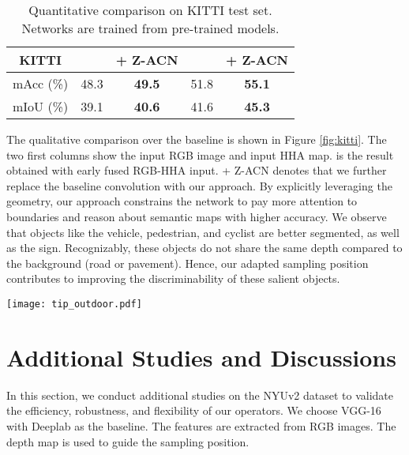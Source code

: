 \documentclass[lettersize,journal]{IEEEtran}
\begin{document}
\begin{table}[t]
\centering
\caption{Quantitative comparison on KITTI test set. Networks are trained from pre-trained models.}
\begin{tabular}[ht]{ c c c | c c}
\hline
KITTI &  &  + Z-ACN &    & \textbf{+ Z-ACN} \\
\hline
mAcc (\%)&  48.3 & \textbf{49.5} & 51.8   & \textbf{55.1}\\
mIoU (\%)&  39.1 & \textbf{40.6} & 41.6   & \textbf{45.3} \\
\hline
\end{tabular}

\label{prekitti}
\end{table}

The qualitative comparison over the baseline is shown in Figure \ref{fig:kitti}. The two first columns show the input RGB image and input HHA map.  is the result obtained with early fused RGB-HHA input. + Z-ACN denotes that we further replace the baseline convolution with our approach. By explicitly leveraging the geometry, our approach constrains the network to pay more attention to boundaries and reason about semantic maps with higher accuracy. We observe that objects like the vehicle, pedestrian, and cyclist are better segmented, as well as the sign. Recognizably, these objects do not share the same depth compared to the background (road or pavement). Hence, our adapted sampling position contributes to improving the discriminability of these salient objects.


\begin{figure*}
\centering
\texttt{[image: tip\_outdoor.pdf]} 
\caption{On the left we illustrate the qualitative comparison on the NYUv2 dataset. The two first columns are the input RGB and HHA, respectively.  represents the semantic map obtained with early fused RGB-HHA input. + Z-ACN stands for the results obtained by inserting our depth-adapted sampling position into the baseline. It can be seen that our approach can also improve the baseline performance in outdoor scenes. The black regions in "GT" are the ignoring category. On the right, we illustrate the per-class improvement above the baseline. We improve 7/11 objects with 3.7\% mean IoU increment. Segmentation results on the KITTI test dataset. GT stands for ground truth. The black regions in "GT" are the ignoring category.}
\label{fig:kitti}
\end{figure*}


\section{Additional Studies and Discussions}
\label{study}
In this section, we conduct additional studies on the NYUv2 dataset to validate the efficiency, robustness, and flexibility of our operators. We choose VGG-16 with Deeplab as the baseline. The features are extracted from RGB images. The depth map is used to guide the sampling position. 
\end{document}
